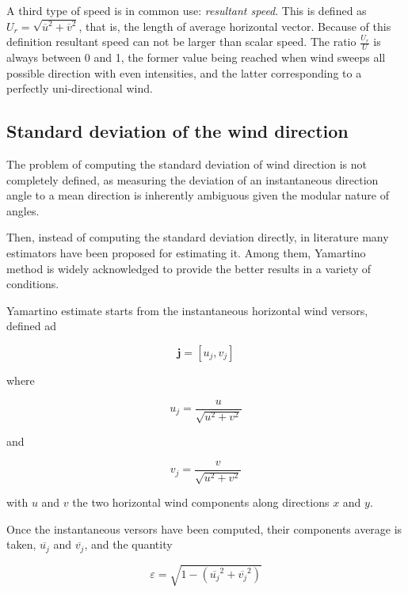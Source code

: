 \documentclass[a4paper,10pt]{book}
\begin{document}
A third type of speed is in common use: \emph{resultant speed}. This is defined as $U_{r} = \sqrt{\overline{u}^{2} + \overline{v}^{2}}$, that is, the length of average horizontal vector. Because of this definition resultant speed can not be larger than scalar speed. The ratio $\frac{U_{r}}{U}$ is always between 0 and 1, the former value being reached when wind sweeps all possible direction with even intensities, and the latter corresponding to a perfectly uni-directional wind.


\subsection{Standard deviation of the wind direction}

The problem of computing the standard deviation of wind direction is not completely defined, as measuring the deviation of an instantaneous direction angle to a mean direction is inherently ambiguous given the modular nature of angles.

Then, instead of computing the standard deviation directly, in literature many estimators have been proposed for estimating it. Among them, Yamartino method is widely acknowledged to provide the better results in a variety of conditions.

Yamartino estimate starts from the instantaneous horizontal wind versors, defined ad

\begin{equation}\label{eq:Horizontal wind versors}
	\mathbf{j} = \left [ u_{j}, v_{j} \right ]
\end{equation}

\noindent where

\begin{equation}
	u_{j} = \frac{u}{\sqrt{u^{2} + v^{2}}}
\end{equation}

\noindent and

\begin{equation}
	v_{j} = \frac{v}{\sqrt{u^{2} + v^{2}}}
\end{equation}

\noindent with $u$ and $v$ the two horizontal wind components along directions $x$ and $y$.

Once the instantaneous versors have been computed, their components average is taken, $\overline{u_{j}}$ and $\overline{v_{j}}$, and the quantity

\begin{equation}\label{eq:Yamartino epsilon}
	\varepsilon = \sqrt{1 - \left( \overline{u_{j}}^{2} + \overline{v_{j}}^{2} \right)}
\end{equation}
\end{document}
